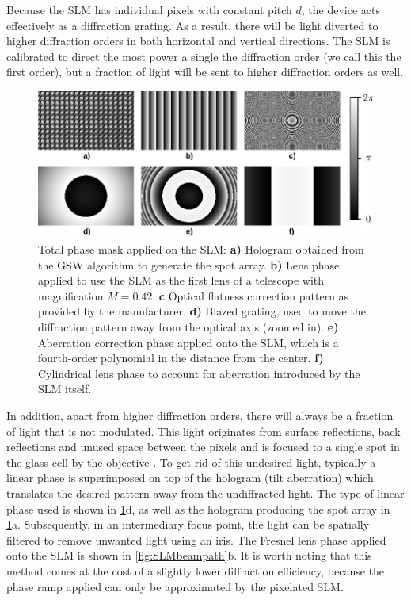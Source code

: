 Because the SLM has individual pixels with constant pitch $d$, the device acts effectively as a diffraction grating.
As a result, there will be light diverted to higher diffraction orders in both horizontal and vertical directions.
The SLM is calibrated to direct the most power a single the diffraction order (we call this the first order), but a fraction of light will be sent to higher diffraction orders as well.

\begin{figure}
	\centering
	\includegraphics[width=\textwidth]{figures/hologram.png}
	\caption{
		Total phase mask applied on the SLM: \textsf{\textbf{a)}} Hologram obtained from the \ac{GSW} algorithm to generate the spot array.
		\textsf{\textbf{b)}} Lens phase applied to use the SLM as the first lens of a telescope with magnification $M=0.42$.
		\textsf{\textbf{c}} Optical flatness correction pattern as provided by the manufacturer.
		\textsf{\textbf{d)}} Blazed grating, used to move the diffraction pattern away from the optical axis (zoomed in).
		\textsf{\textbf{e)}} Aberration correction phase applied onto the SLM, which is a fourth-order polynomial in the distance from the center.
		\textsf{\textbf{f)}} Cylindrical lens phase to account for aberration introduced by the SLM itself.
	}
	\label{fig:SLMphase}
\end{figure}

In addition, apart from higher diffraction orders, there will always be a fraction of light that is not modulated.
This light originates from surface reflections, back reflections and unused space between the pixels and is focused to a single spot in the glass cell by the objective \cite{Bijnen2013}.
To get rid of this undesired light, typically a linear phase is superimposed on top of the hologram (tilt aberration) which translates the desired pattern away from the undiffracted light.
The type of linear phase used is shown in \cref{fig:SLMphase}d, as well as the hologram producing the spot array in \cref{fig:SLMphase}a.
Subsequently, in an intermediary focus point, the light can be spatially filtered to remove unwanted light using an iris. 
The Fresnel lens phase applied onto the SLM is shown in \cref{fig:SLMbeampath}b.
It is worth noting that this method comes at the cost of a slightly lower diffraction efficiency, because the phase ramp applied can only be approximated by the pixelated SLM.

